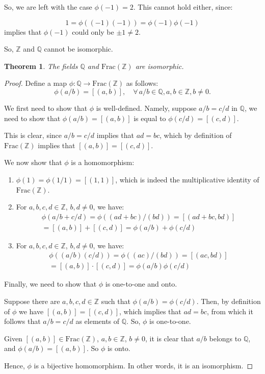 \documentclass[a4paper,12pt]{report}
\newcommand{\Frac}{\mathrm{Frac}}
\newcounter{statement}
\numberwithin{statement}{chapter}
\newtheorem{thm}[statement]{Theorem}
\numberwithin{equation}{chapter}
\numberwithin{section}{chapter}
\numberwithin{subsection}{section}
\begin{document}
So, we are left with the case $\phi(-1) = 2$.  This cannot hold either,
since:




\[
1 = \phi((-1)(-1)) = \phi(-1)\phi(-1)
\]
implies that $\phi(-1)$ could only be $\pm 1 \neq 2$.


So, $\mathbb{Z}$ and $\mathbb{Q}$ cannot be isomorphic.





\begin{thm}
The fields $\mathbb{Q}$ and $\mathrm{Frac}(\mathbb{Z})$ are isomorphic.
\end{thm}
\begin{proof}

Define a map $\phi: \mathbb{Q} \rightarrow \mathrm{Frac}(\mathbb{Z})$ as follows:
\[
\phi(a/b) = [(a, b)],\quad \forall\, a/b \in \mathbb{Q}, a, b \in \mathbb{Z}, b \neq 0.
\]

We first need to show that $\phi$ is well-defined.
Namely, suppose $a/b = c/d$ in $\mathbb{Q}$,
we need to show that $\phi(a/b) = [(a, b)]$ is equal to $\phi(c/d) = [(c, d)]$.


This is clear, since $a/b = c/d$ implies that $ad = bc$,
which by definition of $\Frac(\mathbb{Z})$ implies that $[(a, b)] = [(c, d)]$.


We now show that $\phi$ is a homomorphism:


\begin{enumerate}
\item 
$\phi(1) = \phi(1/1) = [(1, 1)]$, which is indeed the multiplicative identity of $\Frac(\mathbb{Z})$.

\item 
For $a, b, c, d \in \mathbb{Z}$, $b, d \neq 0$, we have:
\begin{multline*}
\phi(a/b + c/d) = \phi((ad + bc)/(bd)) = [(ad + bc, bd)]\\
= [(a, b)] + [(c, d)] = \phi(a/b) + \phi(c/d)
\end{multline*}

\item 
For $a, b, c, d \in \mathbb{Z}$, $b, d \neq 0$, we have:
\begin{multline*}
\phi((a/b)(c/d)) = \phi((ac)/(bd)) = [(ac, bd)]\\
= [(a, b)]\cdot[(c, d)] = \phi(a/b)\phi(c/d)
\end{multline*}
\end{enumerate}

Finally, we need to show that $\phi$ is one-to-one and onto.


Suppose there are $a, b, c, d \in \mathbb{Z}$ such that $\phi(a/b) = \phi(c/d)$.
Then, by definition of $\phi$ we have $[(a, b)] = [(c, d)]$,
which implies that $ad = bc$,
from which it follows that $a/b = c/d$ as elements of $\mathbb{Q}$.
So, $\phi$ is one-to-one.


Given $[(a, b)] \in \Frac(\mathbb{Z})$, $a, b\in \mathbb{Z}$, $b \neq 0$,
it is clear that
$a/b$ belongs to $\mathbb{Q}$, and $\phi(a/b) = [(a, b)]$.
So $\phi$ is onto.


Hence, $\phi$ is a bijective homomorphism.  In other words, it is an isomorphism.


\end{proof}
\end{document}
